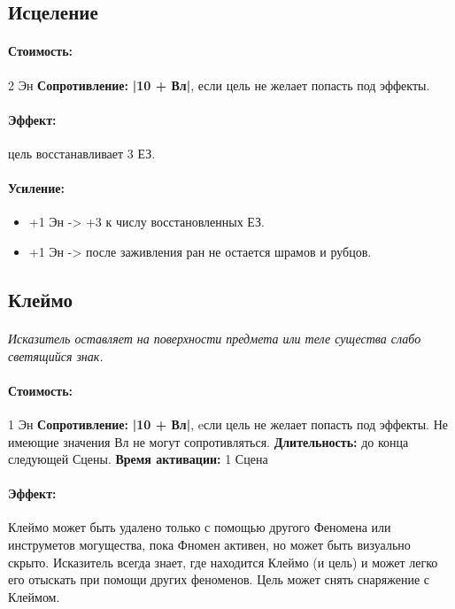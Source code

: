 \subsection{Исцеление}
\paragraph{} 
\textit{
\tbd}
\paragraph{Стоимость: }2 Эн
\newline
\textbf{Сопротивление: }
\textbf{|10 + Вл|}, если цель не желает попасть под эффекты.
\paragraph{Эффект: }цель восстанавливает 3 ЕЗ.
\paragraph{Усиление:}
\begin{itemize}
\item+1 Эн -> +3 к числу восстановленных ЕЗ.
\item+1 Эн -> после заживления ран не остается шрамов и рубцов.
\end{itemize}
\subsection{Клеймо}
\paragraph{} 
\textit{Исказитель оставляет на поверхности предмета или теле существа слабо светящийся знак.}
\paragraph{Стоимость: }1 Эн
\newline
\textbf{Сопротивление: }
\textbf{|10 + Вл|}, eсли цель не желает попасть под эффекты. Не имеющие значения Вл не могут сопротивляться.
\newline 
\textbf{Длительность: }до конца следующей Сцены.
\newline 
\textbf{Время активации: }1 Сцена
\paragraph{Эффект: }Клеймо может быть удалено только с помощью другого Феномена или инструметов могущества, пока Фномен активен, но может быть визуально скрыто. Исказитель всегда знает, где находится Клеймо (и цель) и может легко его отыскать при помощи других феноменов. Цель может снять снаряжение с Клеймом.
